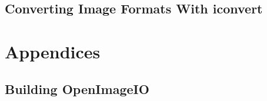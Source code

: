 \documentclass[11pt,letterpaper]{book}
\begin{document}
\chapter{Converting Image Formats With {\kw iconvert}}

\part{Appendices}
\begin{appendix}

\chapter{Building OpenImageIO}

%
%
\end{appendix}

\backmatter

%

\printindex
\end{document}
